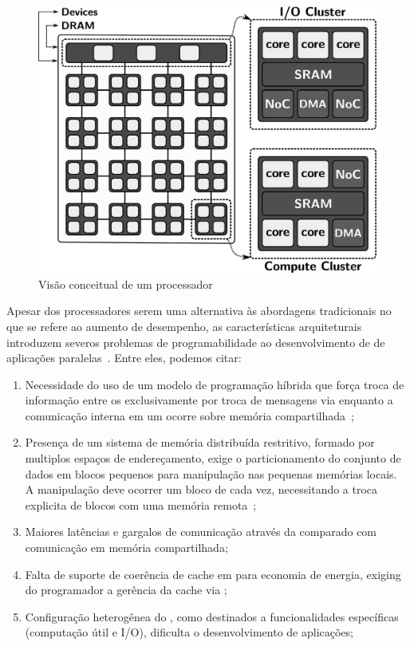 \begin{figure}[t]
	\centering
	\includegraphics[width=0.5\linewidth]{content/images/lw-overview-gs.jpg}
	\caption{Visão conceitual de um processador \lw~\cite{penna2021inter}}
    \label{fig.lw-overview}
\end{figure}

Apesar dos processadores \lws serem uma alternativa às abordagens tradicionais no que se refere ao aumento de desempenho, as características arquiteturais introduzem severos problemas de programabilidade ao desenvolvimento de \software de aplicações paralelas~\cite{Castro-PARCO:2016}. Entre eles, podemos citar:

\begin{enumerate}[label= (\roman*)]
    \item Necessidade do uso de um modelo de programação híbrida que força troca de informação entre os \clusters exclusivamente por troca de mensagens via \noc enquanto a comunicação interna em um \cluster ocorre sobre memória compartilhada~\cite{kelly2013};
    \item Presença de um sistema de memória distribuída restritivo, formado por multiplos espaços de endereçamento, exige o particionamento do conjunto de dados em blocos pequenos para manipulação nas pequenas memórias locais. A manipulação deve ocorrer um bloco de cada vez, necessitando a troca explicita de blocos com uma memória remota~\cite{Castro-PARCO:2016};
    \item Maiores latências e gargalos de comunicação através da \noc comparado com comunicação em memória compartilhada;
    \item Falta de suporte de coerência de cache em \hardware para economia de energia, exiging do programador a gerência da cache via \software;
    \item Configuração heterogênea do \hardware, como \clusters destinados a funcionalidades específicas (computação útil e I/O), dificulta o desenvolvimento de aplicações;
\end{enumerate}

